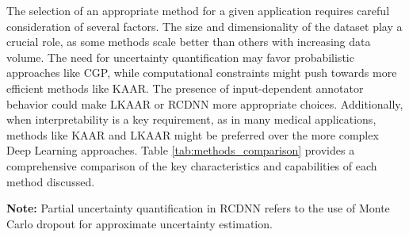 The selection of an appropriate method for a given application
requires careful consideration of several factors. The size and
dimensionality of the dataset play a crucial role, as some methods
scale better than others with increasing data volume. The need for
uncertainty quantification may favor probabilistic approaches like
CGP, while computational constraints might push towards more
efficient methods like KAAR. The presence of input-dependent
annotator behavior could make \gls{LKAAR} or \gls{RCDNN} more appropriate
choices. Additionally, when interpretability is a key requirement, as
in many medical applications, methods like \gls{KAAR} and \gls{LKAAR}
might be preferred over the more complex Deep Learning approaches.
Table \ref{tab:methods_comparison} provides a comprehensive
comparison of the key characteristics and capabilities of each method discussed.

\begin{table}[!htb]
\caption{Comparison of Multiple Annotator Learning Methods}
\label{tab:methods_comparison}
\centering
{}
\vspace{0.1cm}
{\small{\textbf{Note:} Partial uncertainty quantification in \gls{RCDNN}
  refers to the use of Monte Carlo dropout for approximate
uncertainty estimation.}}
\end{table}

